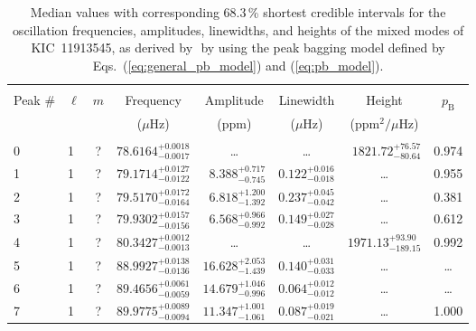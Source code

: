 \begin{table*}[!]
\caption{Median values with corresponding 68.3\,\% shortest credible intervals for the oscillation frequencies, amplitudes, linewidths, and heights of the mixed modes of KIC~11913545, as derived by \diamonds\,\,by using the peak bagging model defined by Eqs.~(\ref{eq:general_pb_model}) and (\ref{eq:pb_model}).}
\label{tab:11913545m}
\centering
\begin{tabular}{llcrrlrc}
\hline\hline
\\[-8pt]      
Peak \# & $\ell$ & $m$ & \multicolumn{1}{c}{Frequency} & \multicolumn{1}{c}{Amplitude} & \multicolumn{1}{c}{Linewidth} & \multicolumn{1}{c}{Height}& $p_\mathrm{B}$\\
 & & & \multicolumn{1}{c}{($\mu$Hz)} & \multicolumn{1}{c}{(ppm)} & \multicolumn{1}{c}{($\mu$Hz)} & \multicolumn{1}{c}{(ppm$^2/\mu$Hz)}\\
\hline \\[-8pt]
0 & 1 & ? & $     78.6164_{-      0.0017}^{+      0.0018}$ & \multicolumn{1}{c}{\dots} & \multicolumn{1}{c}{\dots} & $     1821.72_{-       80.64}^{+       76.57}$ & 0.974\\[1pt]
1 & 1 & ? & $     79.1714_{-      0.0122}^{+      0.0127}$ & $       8.388_{-       0.745}^{+       0.717}$ & $       0.122_{-       0.018}^{+       0.016}$ & \multicolumn{1}{c}{\dots} & 0.955 \\[1pt]
2 & 1 & ? & $     79.5170_{-      0.0164}^{+      0.0172}$ & $       6.818_{-       1.392}^{+       1.200}$ & $       0.237_{-       0.042}^{+       0.045}$ & \multicolumn{1}{c}{\dots} & 0.381 \\[1pt]
3 & 1 & ? & $     79.9302_{-      0.0156}^{+      0.0157}$ & $       6.568_{-       0.992}^{+       0.966}$ & $       0.149_{-       0.028}^{+       0.027}$ & \multicolumn{1}{c}{\dots} & 0.612 \\[1pt]
4 & 1 & ? & $     80.3427_{-      0.0013}^{+      0.0012}$ & \multicolumn{1}{c}{\dots} & \multicolumn{1}{c}{\dots} & $     1971.13_{-      189.15}^{+       93.90}$ & 0.992 \\[1pt]

5 & 1 & ? & $     88.9927_{-      0.0136}^{+      0.0138}$ & $      16.628_{-       1.439}^{+       2.053}$ & $       0.140_{-       0.033}^{+       0.031}$ & \multicolumn{1}{c}{\dots} & \dots \\[1pt]
6 & 1 & ? & $     89.4656_{-      0.0059}^{+      0.0061}$ & $      14.679_{-       0.996}^{+       1.046}$ & $       0.064_{-       0.012}^{+       0.012}$ & \multicolumn{1}{c}{\dots} & \dots \\[1pt]
7 & 1 & ? & $     89.9775_{-      0.0094}^{+      0.0089}$ & $      11.347_{-       1.061}^{+       1.001}$ & $       0.087_{-       0.021}^{+       0.019}$ & \multicolumn{1}{c}{\dots} & 1.000 \\[1pt]


\end{tabular}
\end{table*}
